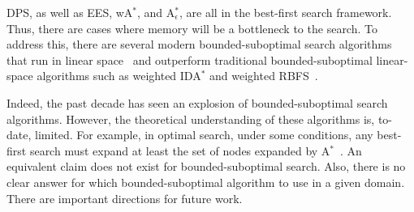 \documentclass{article}
\newcommand{\ees}{\ac{EES}\xspace}
\newcommand{\dps}{\ac{DPS}\xspace}
\newcommand{\astar}{A$^*$\xspace}
\newcommand{\ida}{IDA$^*$\xspace}
\newcommand{\wastar}{wA$^*$\xspace}
\newcommand{\astarepsilon}{A$^*_\epsilon$\xspace}
\begin{document}
\dps, as well as \ees, \wastar, and \astarepsilon, are all in the best-first search framework. Thus, there are cases where memory will be a bottleneck to the search. To address this, there are several modern bounded-suboptimal search algorithms that run in linear space~\cite{hatem2014bounded,hatem2013bounded} and outperform traditional bounded-suboptimal linear-space algorithms such as weighted \ida and weighted RBFS~\cite{Korf1992LinearSpaceBestFirstSearch}. 



Indeed, the past decade has seen an explosion of bounded-suboptimal search algorithms. However, the theoretical understanding of these algorithms is, to-date, limited. 
For example, in optimal search, under some conditions, any best-first search must expand at least the set of nodes expanded by \astar~\cite{dechter1985generalized,goldenberg2014enhanced,holte2019onThe}. An equivalent claim does not exist for bounded-suboptimal search. Also, there is no clear answer for which bounded-suboptimal algorithm to use in a given domain. There are important directions for future work. 









\end{document}
